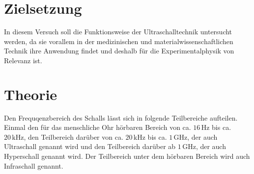 \section{Zielsetzung}
\label{sec:Zielsetzung}
In diesem Versuch soll die Funktionsweise der Ultraschalltechnik untersucht werden, da sie vorallem in der
medizinischen und materialwissenschaftlichen Technik ihre Anwendung findet und deshalb für die
Experimentalphysik von Relevanz ist.

\section{Theorie}
\label{sec:Theorie}
Den Frequqenzbereich des Schalls lässt sich in folgende Teilbereiche aufteilen. Einmal den für das menschliche
Ohr hörbaren Bereich von ca. $16\,\unit{\hertz}$ bis ca. $20\,\unit{\kilo\hertz}$, den Teilbereich darüber
von ca. $20\,\unit{\kilo\hertz}$ bis ca. $1\,\unit{\giga\hertz}$, der auch Ultraschall genannt wird und den
Teilbereich darüber ab $1\,\unit{\giga\hertz}$, der auch Hyperschall genannt wird. Der Teilbereich unter dem
hörbaren Bereich wird auch Infraschall genannt.

